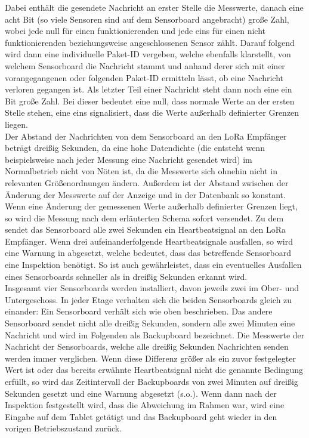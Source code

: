 \documentclass[a4paper, 12pt]{article}
\begin{document}
Dabei enthält die gesendete Nachricht an erster Stelle die Messwerte, danach eine acht Bit (so viele Sensoren sind auf dem Sensorboard angebracht) große Zahl, wobei jede null für einen funktionierenden und jede eins für einen nicht funktionierenden beziehungsweise angeschlossenen Sensor zählt. Darauf folgend wird dann eine individuelle Paket-ID vergeben, welche ebenfalls klarstellt, von welchem Sensorboard die Nachricht stammt und anhand derer sich mit einer vorangegangenen oder folgenden Paket-ID ermitteln lässt, ob eine Nachricht verloren gegangen ist. Als letzter Teil einer Nachricht steht dann noch eine ein Bit große Zahl. Bei dieser bedeutet eine null, dass normale Werte an der ersten Stelle stehen, eine eins signalisiert, dass die Werte außerhalb definierter Grenzen liegen.\\ 

Der Abstand der Nachrichten von dem Sensorboard an den LoRa Empfänger beträgt dreißig Sekunden, da eine hohe Datendichte (die entsteht wenn beispielsweise nach jeder Messung eine Nachricht gesendet wird) im Normalbetrieb nicht von Nöten ist, da die Messwerte sich ohnehin nicht in relevanten Größenordnungen ändern. Außerdem ist der Abstand zwischen der Änderung der Messwerte auf der Anzeige und in der Datenbank so konstant. Wenn eine Änderung der gemessenen Werte außerhalb definierter Grenzen liegt, so wird die Messung nach dem erläuterten Schema sofort versendet. Zu dem sendet das Sensorboard alle zwei Sekunden ein Heartbeatsignal an den LoRa Empfänger. Wenn drei aufeinanderfolgende Heartbeatsignale ausfallen, so wird eine Warnung in abgesetzt, welche bedeutet, dass das betreffende Sensorboard eine Inspektion benötigt. So ist auch gewährleistet, dass ein eventuelles Ausfallen eines Sensorboards schneller als in dreißig Sekunden erkannt wird.\\

Insgesamt vier Sensorboards werden installiert, davon jeweils zwei im Ober- und Untergeschoss. In jeder Etage verhalten sich die beiden Sensorboards gleich zu einander: Ein Sensorboard verhält sich wie oben beschrieben. Das andere Sensorboard sendet nicht alle dreißig Sekunden, sondern alle zwei Minuten eine Nachricht und wird im Folgenden als Backupboard bezeichnet. Die Messwerte der Nachricht der Sensorboards, welche alle dreißig Sekunden Nachrichten senden werden immer verglichen. Wenn diese Differenz größer als ein zuvor festgelegter Wert ist oder das bereits erwähnte Heartbeatsignal nicht die genannte Bedingung erfüllt, so wird das Zeitintervall der Backupboards von zwei Minuten auf dreißig Sekunden gesetzt und eine Warnung abgesetzt (s.o.). Wenn dann nach der Inspektion festgestellt wird, dass die Abweichung im Rahmen war, wird eine Eingabe auf dem Tablet getätigt und das Backupboard geht wieder in den vorigen Betriebszustand zurück.\\
\end{document}
